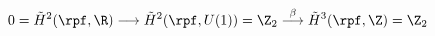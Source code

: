 \begin{equation}
0=\tilde{H}^2(\rpf,\R)\longrightarrow\tilde{H}^2(\rpf,U(1))=\Z_2\stackrel{\beta}{\longrightarrow}\tilde{H}^3(\rpf,\Z)=\Z_2
\end{equation}

